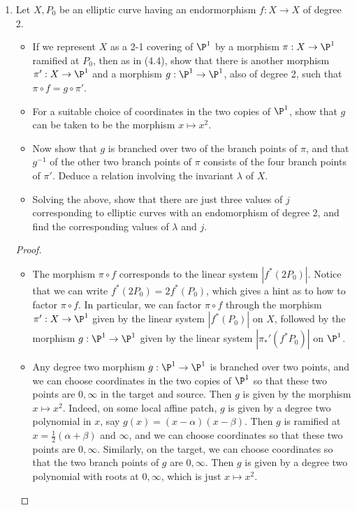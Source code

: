 \documentclass[a4paper]{article}
\begin{document}
\begin{enumerate} [label=\textbf{\arabic*.}, leftmargin=0em]
    \item[\textbf{5.}] Let $X, P_0$ be an elliptic curve having an endormorphism $f : X \to X$ of degree 2.
          \begin{itemize}
              \item[(a)] If we represent $X$ as a 2-1 covering of $\P^1$ by a morphism $\pi : X \to \P^1$ ramified at $P_0$, then as in (4.4), show that there is another morphism $\pi' : X \to \P^1$ and a morphism $g : \P^1 \to \P^1$, also of degree 2, such that $\pi \circ f = g \circ \pi'$.
              \item[(b)] For a suitable choice of coordinates in the two copies of $\P^1$, show that $g$ can be taken to be the morphism $x \mapsto x^2$.
              \item[(c)] Now show that $g$ is branched over two of the branch points of $\pi$, and that $g^{-1}$ of the other two branch points of $\pi$ consists of the four branch points of $\pi'$.
                    Deduce a relation involving the invariant $\lambda$ of $X$.
              \item[(d)] Solving the above, show that there are just three values of $j$ corresponding to elliptic curves with an endomorphism of degree 2, and find the corresponding values of $\lambda$ and $j$.
          \end{itemize}

          \begin{proof} $ $ \vspace{0pt}
              \begin{itemize} [leftmargin=0cm]
                  \item[(a)] The morphism $\pi \circ f$ corresponds to the linear system $|f^*(2P_0)|$.
                        Notice that we can write $f^*(2P_0) = 2f^*(P_0)$, which gives a hint as to how to factor $\pi \circ f$.
                        In particular, we can factor $\pi \circ f$ through the morphism $\pi' : X \to \P^1$ given by the linear system $|f^*(P_0)|$ on $X$, followed by the morphism $g : \P^1 \to \P^1$ given by the linear system $|\pi_*'(f^*P_0)|$ on $\P^1$.

                  \item[(b)] Any degree two morphism $g : \P^1 \to \P^1$ is branched over two points, and we can choose coordinates in the two copies of $\P^1$ so that these two points are $0, \infty$ in the target and source.
                        Then $g$ is given by the morphism $x \mapsto x^2$.
                        Indeed, on some local affine patch, $g$ is given by a degree two polynomial in $x$, say $g(x) = (x - \alpha)(x - \beta)$.
                        Then $g$ is ramified at $x = \frac{1}{2}(\alpha + \beta)$ and $\infty$, and we can choose coordinates so that these two points are $0, \infty$.
                        Similarly, on the target, we can choose coordinates so that the two branch points of $g$ are $0, \infty$.
                        Then $g$ is given by a degree two polynomial with roots at $0, \infty$, which is just $x \mapsto x^2$.


\end{itemize}
\end{proof}
\end{enumerate}
\end{document}
